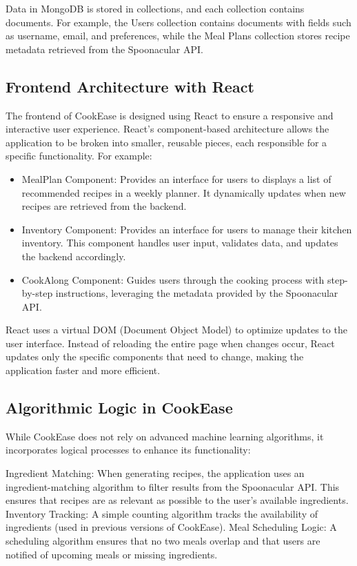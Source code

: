 \documentclass[10pt,twocolumn]{article}
\begin{document}
Data in MongoDB is stored in collections, and each collection contains documents. For example, the Users collection contains documents with fields such as username, email, and preferences, while the Meal Plans collection stores recipe metadata retrieved from the Spoonacular API.

\subsection{Frontend Architecture with React}
The frontend of CookEase is designed using React to ensure a responsive and interactive user experience. React’s component-based architecture allows the application to be broken into smaller, reusable pieces, each responsible for a specific functionality. For example:
\begin{itemize}
    \item MealPlan Component: Provides an interface for users to displays a list of recommended recipes in a weekly planner. It dynamically updates when new recipes are retrieved from the backend.
    \item Inventory Component: Provides an interface for users to manage their kitchen inventory. This component handles user input, validates data, and updates the backend accordingly.
    \item CookAlong Component: Guides users through the cooking process with step-by-step instructions, leveraging the metadata provided by the Spoonacular API.
\end{itemize}
React uses a virtual DOM (Document Object Model) to optimize updates to the user interface. Instead of reloading the entire page when changes occur, React updates only the specific components that need to change, making the application faster and more efficient.

\subsection{Algorithmic Logic in CookEase}
While CookEase does not rely on advanced machine learning algorithms, it incorporates logical processes to enhance its functionality:

Ingredient Matching: When generating recipes, the application uses an ingredient-matching algorithm to filter results from the Spoonacular API. This ensures that recipes are as relevant as possible to the user’s available ingredients.
Inventory Tracking: A simple counting algorithm tracks the availability of ingredients (used in previous versions of CookEase).
Meal Scheduling Logic: A scheduling algorithm ensures that no two meals overlap and that users are notified of upcoming meals or missing ingredients.
\end{document}
